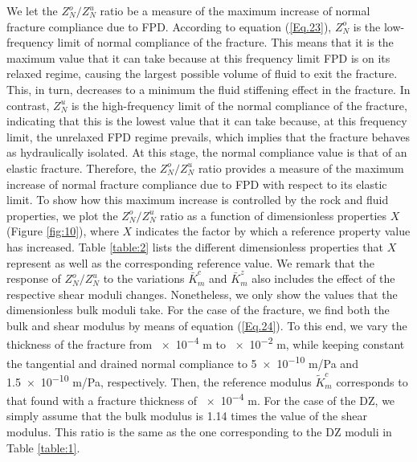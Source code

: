 \documentclass[draft]{agujournal2019}
\begin{document}
We let the $Z_N^o/Z_N^u$ ratio be a measure of the maximum increase of normal fracture compliance due to FPD. According to equation (\ref{Eq.23}), $Z_N^o$ is the low-frequency limit of normal compliance of the fracture. This means that it is the maximum value that it can take because at this frequency limit FPD is on its relaxed regime,  causing the largest possible volume of fluid  to exit the fracture. This, in turn, decreases to a minimum the fluid stiffening effect in the fracture. In contrast, $Z_N^u$ is the high-frequency limit of the normal compliance of the fracture, indicating that this is the lowest value that it can take because, at this frequency limit, the unrelaxed FPD regime prevails, which implies that the fracture behaves as hydraulically isolated. At this stage, the normal compliance value is that of an elastic fracture. Therefore, the  $Z_N^o/Z_N^u$ ratio provides a measure of the maximum increase of normal fracture compliance due to FPD  with respect to its elastic limit. To show how this maximum increase is controlled by the rock and fluid properties, we plot the $Z_N^o/Z_N^u$ ratio as a function of dimensionless properties $X$ (Figure \ref{fig:10}), where $X$ indicates the factor by which a reference property value has increased. Table \ref{table:2} lists the different dimensionless properties that $X$ represent as well as the corresponding reference value.
We remark that the response of $Z_N^o/Z_N^u$ to the variations $\bar{K}_m^c$ and $\bar{K}_m^z$ also includes the effect of the respective shear moduli changes. Nonetheless, we only show the values that the dimensionless bulk moduli take.
For the case of the fracture, we find  both the bulk and shear modulus by means of equation (\ref{Eq.24}). To this end, we vary the thickness of the fracture from \num{e-4} m to \num{e-2} m, while keeping constant the tangential and drained normal compliance to \num{5e-10} m/Pa and \num{1.5e-10} m/Pa, respectively. Then, the reference modulus $\tilde{K}_m^c$ corresponds to that found with a fracture thickness of \num{e-4} m. For the case of the DZ, we simply assume that the bulk modulus is 1.14 times the value of the shear modulus. This ratio is the same as the one corresponding to the DZ moduli in Table \ref{table:1}.
\end{document}
